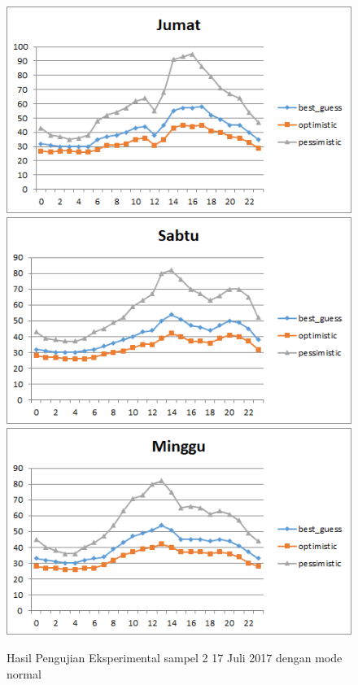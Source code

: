 \begin{figure}[H]
				\centering		
				\includegraphics[]{Gambar/jumatsampel217072017normal.png}
				\includegraphics[]{Gambar/sabtusampel217072017normal.png}
				\includegraphics[]{Gambar/minggusampel217072017normal.png}
				\caption[Hasil Pengujian Eksperimental]{Hasil Pengujian Eksperimental sampel 2 17 Juli 2017 dengan mode normal}
				\label{fig:eksperimentalsampel217072017normal}
\end{figure}
\newpage
			
